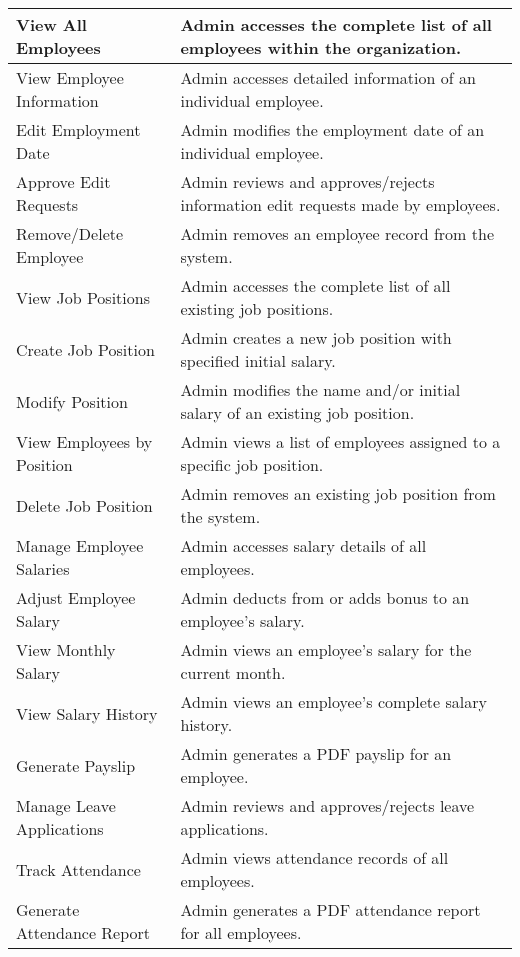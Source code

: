 \documentclass{icsthesis}
\begin{document}
\begin{mainmatter}
\begin{itemize}
\begin{longtable}{|p{}|p{}|}
View All Employees & Admin accesses the complete list of all employees within the organization. \\
\hline
View Employee Information & Admin accesses detailed information of an individual employee. \\
\hline
Edit Employment Date & Admin modifies the employment date of an individual employee. \\
\hline
Approve Edit Requests & Admin reviews and approves/rejects information edit requests made by employees. \\
\hline
Remove/Delete Employee & Admin removes an employee record from the system. \\
\hline
View Job Positions & Admin accesses the complete list of all existing job positions. \\
\hline
Create Job Position & Admin creates a new job position with specified initial salary. \\
\hline
Modify Position & Admin modifies the name and/or initial salary of an existing job position. \\
\hline
View Employees by Position & Admin views a list of employees assigned to a specific job position. \\
\hline
Delete Job Position & Admin removes an existing job position from the system. \\
\hline
Manage Employee Salaries & Admin accesses salary details of all employees. \\
\hline
Adjust Employee Salary & Admin deducts from or adds bonus to an employee's salary. \\
\hline
View Monthly Salary & Admin views an employee's salary for the current month. \\
\hline
View Salary History & Admin views an employee's complete salary history. \\
\hline
Generate Payslip & Admin generates a PDF payslip for an employee. \\
\hline
Manage Leave Applications & Admin reviews and approves/rejects leave applications. \\
\hline
Track Attendance & Admin views attendance records of all employees. \\
\hline
Generate Attendance Report & Admin generates a PDF attendance report for all employees. \\
\end{longtable}



\end{itemize}
\end{mainmatter}
\end{document}

